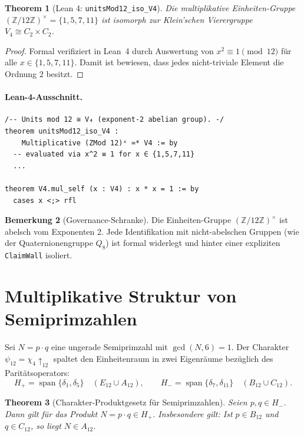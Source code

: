 \documentclass[11pt,a4paper]{article}
\newtheorem{theorem}{Theorem}[section]
\theoremstyle{definition}
\newtheorem{remark}[theorem]{Bemerkung}
\begin{document}
	\begin{theorem}[Lean 4: \texttt{unitsMod12\_iso\_V4}]
		Die multiplikative Einheiten-Gruppe $(\mathbb{Z}/12\mathbb{Z})^\times = \{1, 5, 7, 11\}$ ist isomorph zur Klein'schen Vierergruppe $V_4 \cong C_2 \times C_2$.
	\end{theorem}
	\begin{proof}
		Formal verifiziert in Lean~4 durch Auswertung von $x^2 \equiv 1 \pmod{12}$ für alle $x \in \{1, 5, 7, 11\}$. Damit ist bewiesen, dass jedes nicht-triviale Element die Ordnung 2 besitzt.
	\end{proof}

	\paragraph{Lean-4-Ausschnitt.}
	\begin{lstlisting}[caption={Ausschnitt: $V_4$-Isomorphismus (Lean~4)}]
/-- Units mod 12 ≅ V₄ (exponent-2 abelian group). -/
theorem unitsMod12_iso_V4 :
    Multiplicative (ZMod 12)ˣ ≃* V4 := by
  -- evaluated via x^2 ≡ 1 for x ∈ {1,5,7,11}
  ...

theorem V4.mul_self (x : V4) : x * x = 1 := by
  cases x <;> rfl
	\end{lstlisting}
	
	\begin{remark}[Governance-Schranke]
		Die Einheiten-Gruppe $(\mathbb{Z}/12\mathbb{Z})^\times$ ist abelsch vom Exponenten 2. Jede Identifikation mit nicht-abelschen Gruppen (wie der Quaternionengruppe $Q_8$) ist formal widerlegt und hinter einer expliziten \texttt{ClaimWall} isoliert.
	\end{remark}
	
	\section{Multiplikative Struktur von Semiprimzahlen}
	
	Sei $N = p \cdot q$ eine ungerade Semiprimzahl mit $\gcd(N, 6) = 1$. Der Charakter $\psi_{12} = \chi_4 \uparrow_{12}$ spaltet den Einheitenraum in zwei Eigenräume bezüglich des Paritätsoperators:
	\[
	H_+ = \operatorname{span}\{\delta_1, \delta_5\} \quad (E_{12} \cup A_{12}), \qquad H_- = \operatorname{span}\{\delta_7, \delta_{11}\} \quad (B_{12} \cup C_{12}).
	\]
	
	\begin{theorem}[Charakter-Produktgesetz für Semiprimzahlen]
		Seien $p, q \in H_-$. Dann gilt für das Produkt $N = p \cdot q \in H_+$. Insbesondere gilt: Ist $p \in B_{12}$ und $q \in C_{12}$, so liegt $N \in A_{12}$.
	\end{theorem}
	
\end{document}
